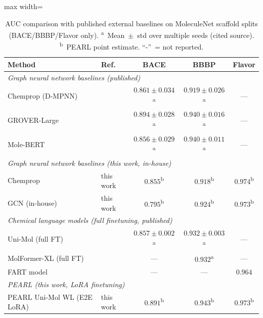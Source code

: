 \documentclass[final,1p,times]{elsarticle}
\begin{document}
\begin{table}[!ht]
\centering
\caption{AUC comparison with published external baselines on MoleculeNet scaffold splits (BACE/BBBP/Flavor only). \textsuperscript{a}~Mean~$\pm$~std over multiple seeds (cited source). \textsuperscript{b}~PEARL point estimate. ``-''~= not reported.}
\label{tab:external_main}
\begin{adjustbox}{max width=\columnwidth}
\begin{tabular}{llccc}
\toprule
\textbf{Method} & \textbf{Ref.} & \textbf{BACE} & \textbf{BBBP} & \textbf{Flavor} \\
\midrule
\multicolumn{5}{l}{\textit{Graph neural network baselines (published)}} \\[2pt]
Chemprop (D-MPNN)      & \cite{yang2019chemprop}  & $0.861 \pm 0.034$\textsuperscript{a} & $0.919 \pm 0.026$\textsuperscript{a} & --- \\
GROVER-Large           & \cite{rong2020grover}    & $0.894 \pm 0.028$\textsuperscript{a} & $0.940 \pm 0.016$\textsuperscript{a} & --- \\
Mole-BERT              & \cite{xia2023molecbert}  & $0.856 \pm 0.029$\textsuperscript{a} & $0.940 \pm 0.011$\textsuperscript{a} & --- \\
\midrule
\multicolumn{5}{l}{\textit{Graph neural network baselines (this work, in-house)}} \\[2pt]
Chemprop    & this work & $0.855$\textsuperscript{b} & $0.918$\textsuperscript{b} & $0.974$\textsuperscript{b} \\
GCN (in-house)         & this work & $0.795$\textsuperscript{b} & $0.924$\textsuperscript{b} & $0.973$\textsuperscript{b} \\
\midrule
\multicolumn{5}{l}{\textit{Chemical language models (full finetuning, published)}} \\[2pt]
Uni-Mol (full FT)      & \cite{zhou2023unimol}    & $0.857 \pm 0.002$\textsuperscript{a} & $0.932 \pm 0.003$\textsuperscript{a} & --- \\
MolFormer-XL (full FT) & \cite{ross2022molformer} & ---                                  & $0.932$\textsuperscript{a}           & --- \\
FART model             & \cite{zimmermann2024fart}& ---                                  & ---                                  & $0.964$ \\
\midrule
\multicolumn{5}{l}{\textit{PEARL (this work, LoRA finetuning)}} \\[2pt]
PEARL Uni-Mol WL (E2E LoRA)   & this work & $\mathbf{0.891}$\textsuperscript{b} & $0.943$\textsuperscript{b}          & $0.973$\textsuperscript{b} \\

\end{tabular}
\end{adjustbox}
\end{table}
\end{document}
